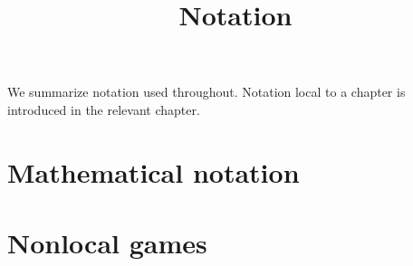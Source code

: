 

%




\title{Notation}
\label{notation}

\maketitle


\tableofcontents

We summarize notation used throughout. Notation local to a chapter is introduced in the relevant chapter. 


\section{Mathematical notation}
\label{section-mathnotation}


\section{Nonlocal games}
\label{section-gamesnotation}










